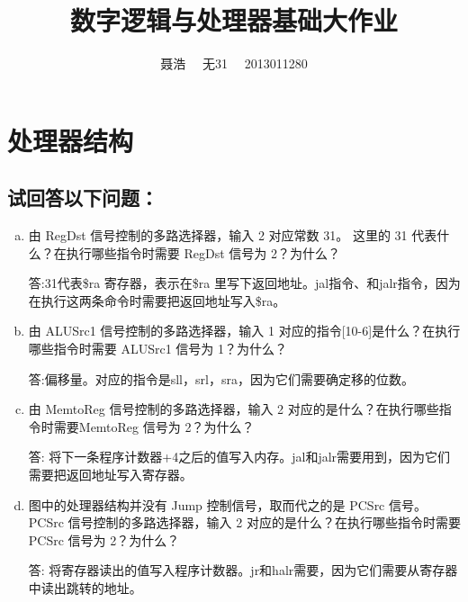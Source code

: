 \documentclass{ctexart}
\title{数字逻辑与处理器基础大作业}
\author{聂浩~~ 无31~~ 2013011280}
\begin{document}
\maketitle
\section{处理器结构}
\subsection{试回答以下问题：}
\begin {enumerate}[a)]
             \item{由 RegDst 信号控制的多路选择器，输入 2 对应常数 31。 这里的 31 代表什么？在执行哪些指令时需要 RegDst 信号为 2？为什么？}

                 答:31代表\$ra 寄存器，表示在\$ra 里写下返回地址。jal指令、和jalr指令，因为在执行这两条命令时需要把返回地址写入\$ra。

             \item{由 ALUSrc1 信号控制的多路选择器，输入 1 对应的指令[10-6]是什么？在执行哪些指令时需要 ALUSrc1 信号为 1？为什么？}

                 答:偏移量。对应的指令是sll，srl，sra，因为它们需要确定移的位数。
             \item{由 MemtoReg 信号控制的多路选择器，输入 2 对应的是什么？在执行哪些指令时需要MemtoReg 信号为 2？为什么？}

                 答: 将下一条程序计数器+4之后的值写入内存。jal和jalr需要用到，因为它们需要把返回地址写入寄存器。

             \item{图中的处理器结构并没有 Jump 控制信号，取而代之的是 PCSrc 信号。 PCSrc 信号控制的多路选择器，输入 2 对应的是什么？在执行哪些指令时需要 PCSrc 信号为 2？为什么？}

                 答: 将寄存器读出的值写入程序计数器。jr和halr需要，因为它们需要从寄存器中读出跳转的地址。


\end{enumerate}
\end{document}
